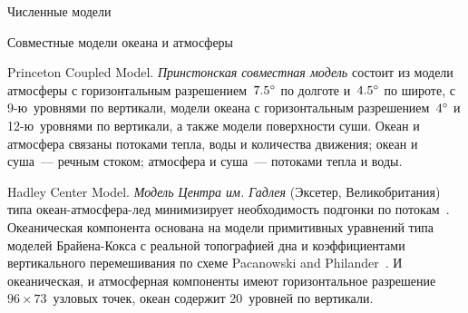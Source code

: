 \begin{chapter}{Численные модели}
\begin{section}{Совместные модели океана и атмосферы}
\begin{paragraph}{Princeton Coupled Model.}%
\emph{Принстонская совместная модель} состоит из модели атмосферы 
с горизонтальным разрешением~${7.5}^\circ$ по долготе и~${4.5}^\circ$ 
по широте, с 9-ю~уровнями по вертикали, модели океана
с горизонтальным разрешением~${4}^\circ$ и 12-ю~уровнями по вертикали, 
а также модели поверхности суши. Океан и атмосфера связаны потоками
тепла, воды и количества движения; океан и суша~--- речным стоком;
атмосфера и суша~--- потоками тепла и воды.
%
\end{paragraph}

\begin{paragraph}{Hadley Center Model.}%
\emph{Модель Центра им. Гадлея} (Эксетер, Великобритания) 
типа океан-атмосфера-лед минимизирует необходимость подгонки по 
потокам~\cite{Johns:1997}. 
Океаническая компонента основана на модели примитивных
уравнений типа моделей Брайена-Кокса с реальной топографией
дна и коэффициентами вертикального перемешивания%
по схеме Pacanowski and Philander~\cite{Pacanowski:1981}. 
И океаническая, и атмосферная компоненты имеют горизонтальное 
разрешение $96\times 73$~узловых точек, океан содержит
20~уровней по вертикали.
%


\end{paragraph}
\end{section}
\end{chapter}
